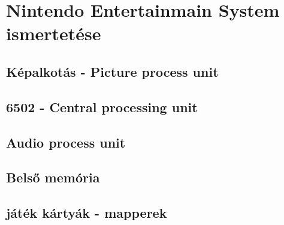 \chapter{Nintendo Entertainmain System ismertetése}


\section{Képalkotás - Picture process unit}

\section{6502 - Central processing unit}

\section{Audio process unit}

\section{Belső memória}

\section{játék kártyák - mapperek}
